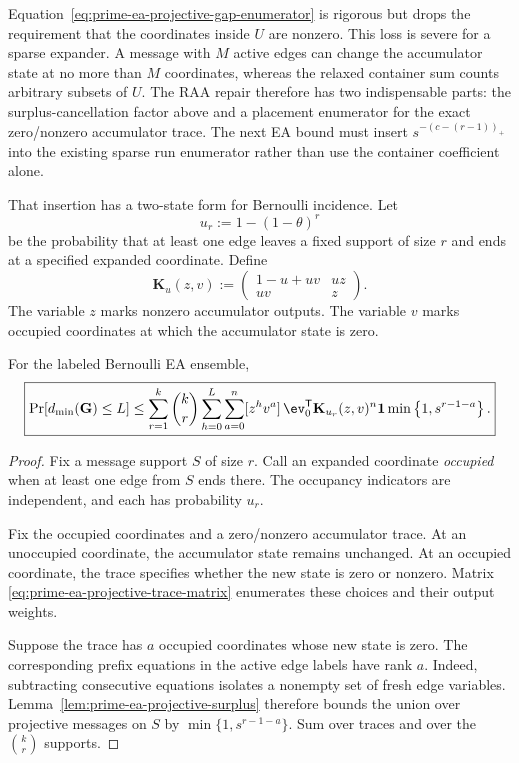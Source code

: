 Equation~\eqref{eq:prime-ea-projective-gap-enumerator} is rigorous but drops
the requirement that the coordinates inside $U$ are nonzero.  This loss is
severe for a sparse expander.  A message with $M$ active edges can change the
accumulator state at no more than $M$ coordinates, whereas the relaxed
container sum counts arbitrary subsets of $U$.  The RAA repair therefore has
two indispensable parts: the surplus-cancellation factor above and a placement
enumerator for the exact zero/nonzero accumulator trace.  The next EA bound
must insert $s^{-(c-(r-1))_+}$ into the existing sparse run enumerator rather
than use the container coefficient alone.

That insertion has a two-state form for Bernoulli incidence.  Let
\begin{equation}
 u_r:=1-(1-\theta)^r
 \label{eq:prime-ea-occupied-probability}
\end{equation}
be the probability that at least one edge leaves a fixed support of size $r$
and ends at a specified expanded coordinate.  Define
\begin{equation}
 \mathbf K_{u}(z,v):=
 \begin{pmatrix}
  1-u+uv&uz\\
  uv&z
 \end{pmatrix}.
 \label{eq:prime-ea-projective-trace-matrix}
\end{equation}
The variable $z$ marks nonzero accumulator outputs.  The variable $v$ marks
occupied coordinates at which the accumulator state is zero.

\begin{theorem}
\label{thm:prime-ea-projective-trace}
For the labeled Bernoulli EA ensemble,
\begin{equation}
 \boxed{
 \Pr[d_{\min}(\G)\leq L]
 \leq
 \sum_{r=1}^k\binom{k}{r}
 \sum_{h=0}^L\sum_{a=0}^n
 [z^hv^a]\,
 \ev_0^{\mathsf T}\mathbf K_{u_r}(z,v)^n\boldsymbol 1
 \min\left\{1,s^{r-1-a}\right\}.
 }
 \label{eq:prime-ea-projective-trace}
\end{equation}
\end{theorem}

\begin{proof}
Fix a message support $S$ of size $r$.  Call an expanded coordinate
\emph{occupied} when at least one edge from $S$ ends there.  The occupancy
indicators are independent, and each has probability $u_r$.

Fix the occupied coordinates and a zero/nonzero accumulator trace.  At an
unoccupied coordinate, the accumulator state remains unchanged.  At an
occupied coordinate, the trace specifies whether the new state is zero or
nonzero.  Matrix \eqref{eq:prime-ea-projective-trace-matrix} enumerates these
choices and their output weights.

Suppose the trace has $a$ occupied coordinates whose new state is zero.  The
corresponding prefix equations in the active edge labels have rank $a$.
Indeed, subtracting consecutive equations isolates a nonempty set of fresh
edge variables.  Lemma~\ref{lem:prime-ea-projective-surplus} therefore bounds
the union over projective messages on $S$ by
$\min\{1,s^{r-1-a}\}$.  Sum over traces and over the $\binom{k}{r}$ supports.
\end{proof}

